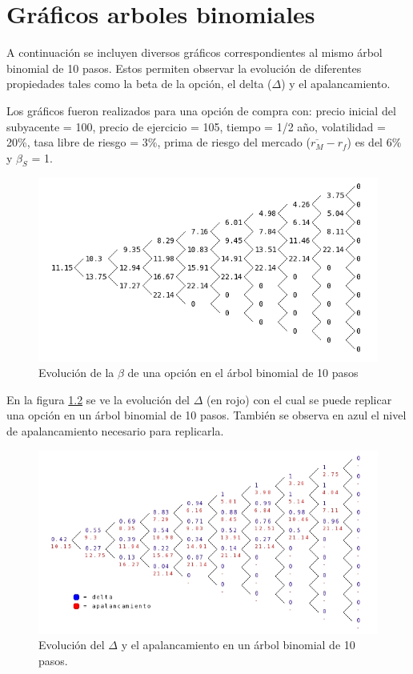 
\chapter{Gráficos arboles binomiales}\label{anexograficos}

A continuación se incluyen diversos gráficos correspondientes al mismo árbol binomial de 10 pasos. Estos permiten observar la evolución de diferentes propiedades tales como la beta de la opción, el delta ($\Delta$) y el apalancamiento.

Los gráficos fueron realizados para una opción de compra con: precio inicial del subyacente = 100, precio de ejercicio = 105, tiempo = 1/2 año, volatilidad = 20\%, tasa libre de riesgo = 3\%, prima de riesgo del mercado ($\overline{r_M} - r_f$) es del 6\% y $\beta_S$ = 1.

\begin{figure}[H]
\centering
\includegraphics[width=1\textwidth]{Images/tree-betas.jpg}
\caption{Evolución de la $\beta$ de una opción en el árbol binomial de 10 pasos}
\label{fig:betaarbolchico}
\end{figure}

En la figura \ref{fig:deltaarbolchico} se ve la evolución del $\Delta$ (en rojo) con el cual se puede replicar una opción en un árbol binomial de 10 pasos. También se observa en azul el nivel de apalancamiento necesario para replicarla.

\begin{figure}[H]
\centering
\includegraphics[width=1\textwidth]{Images/tree-delta-leverage.jpg}
\caption{Evolución del $\Delta$ y el apalancamiento en un árbol binomial de 10 pasos.}
\label{fig:deltaarbolchico}
\end{figure}

